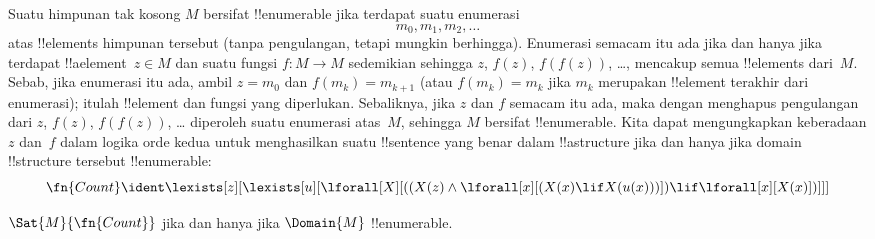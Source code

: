 \documentclass[../../../include/open-logic-section]{subfiles}
\begin{document}
Suatu himpunan tak kosong $M$ bersifat !!{enumerable} jika terdapat suatu
enumerasi
\[
m_0, m_1, m_2, \dots
\]
atas !!{element}s himpunan tersebut (tanpa pengulangan, tetapi mungkin
berhingga). Enumerasi
semacam itu ada jika dan hanya jika terdapat !!a{element}~$z \in M$ dan suatu
fungsi $f\colon M \to M$ sedemikian sehingga $z$, $f(z)$, $f(f(z))$, \dots,
mencakup semua !!{element}s dari~$M$. Sebab, jika enumerasi itu ada, ambil
$z = m_0$ dan $f(m_k) = m_{k+1}$ (atau $f(m_k) = m_k$ jika $m_k$ merupakan
!!{element} terakhir dari enumerasi); itulah !!{element} dan fungsi yang
diperlukan. Sebaliknya, jika $z$ dan $f$ semacam itu ada, maka dengan
menghapus pengulangan dari $z$, $f(z)$, $f(f(z))$, \dots{} diperoleh suatu
enumerasi atas~$M$, sehingga $M$ bersifat !!{enumerable}. Kita dapat
mengungkapkan keberadaan $z$ dan~$f$ dalam logika orde kedua untuk menghasilkan
suatu !!{sentence} yang benar dalam !!a{structure} jika dan hanya jika domain
!!{structure} tersebut !!{enumerable}:
\[
\fn{Count} \ident
\lexists[z][\lexists[u][\lforall[X][((X(z) \land
      \lforall[x][(X(x) \lif X(u(x)))]) \lif \lforall[x][X(x)])]]]
\]

\begin{prop}
$\Sat{M}{\fn{Count}}$ jika dan hanya jika $\Domain{M}$ !!{enumerable}.
\end{prop}
\end{document}
